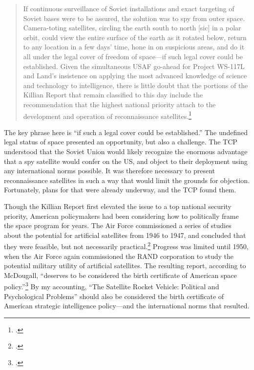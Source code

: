 \documentclass[11pt]{memoir}
\begin{document}
\begin{quote}
	If continuous surveillance of Soviet installations and exact targeting of Soviet bases were to be assured, the solution was to spy from outer space. Camera-toting satellites, circling the earth south to north [sic] in a polar orbit, could view the entire surface of the earth as it rotated below, return to any location in a few days' time, hone in on suspicious areas, and do it all under the legal cover of freedom of space---if such legal cover could be established. Given the simultaneous USAF go-ahead for Project WS-117L and Land's insistence on applying the most advanced knowledge of science and technology to intelligence, there is little doubt that the portions of the Killian Report that remain classified to this day include the recommendation that the highest national priority attach to the development and operation of reconnaissance satellites.\footcite[p.~117]{mcdougall_heavens_1985}
\end{quote}
The key phrase here is ``if such a legal cover could be established.'' The undefined legal status of space presented an opportunity, but also a challenge. The TCP understood that the Soviet Union would likely recognize the enormous advantage that a spy satellite would confer on the US, and object to their deployment using any international norms possible.  It was therefore necessary to present reconnaissance satellites in such a way that would limit the grounds for objection. Fortunately, plans for that were already underway, and the TCP found them.

Though the Killian Report first elevated the issue to a top national security priority, American policymakers had been considering how to politically frame the space program for years. The Air Force commissioned a series of studies about the potential for artificial satellites from 1946 to 1947, and concluded that they were feasible, but not necessarily practical.\footcite[p.~5-6]{peebles_corona_1997} Progress was limited until 1950, when  the Air Force again commissioned the RAND corporation to study the potential military utility of artificial satellites. The resulting report, according to McDougall, ``deserves to be considered the birth certificate of American space policy.''\footcite[p.~108]{mcdougall_heavens_1985} By my accounting, ``The Satellite Rocket Vehicle: Political and Psychological Problems'' should also be considered the birth certificate of American strategic intelligence policy---and the international norms that resulted.
\end{document}
